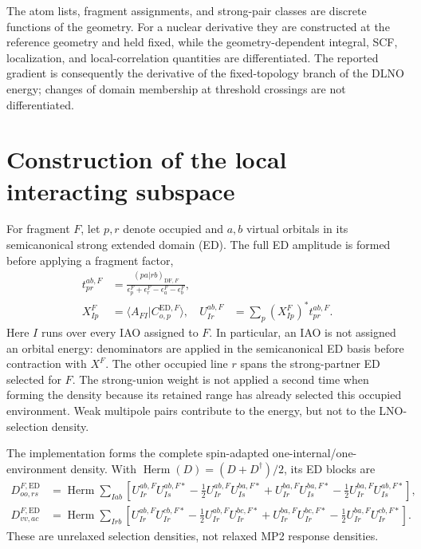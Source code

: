 \documentclass[11pt]{article}
\begin{document}
The atom lists, fragment assignments, and strong-pair classes are discrete
functions of the geometry.  For a nuclear derivative they are constructed at
the reference geometry and held fixed, while the geometry-dependent integral,
SCF, localization, and local-correlation quantities are differentiated.  The
reported gradient is consequently the derivative of the fixed-topology branch
of the DLNO energy; changes of domain membership at threshold crossings are not
differentiated.

\section{Construction of the local interacting subspace}
\label{sec:lis-construction}

For fragment $F$, let $p,r$ denote occupied and $a,b$ virtual orbitals in its
semicanonical strong extended domain (ED).  The full ED amplitude is formed
before applying a fragment factor,
\begin{align}
 t_{pr}^{ab,F}
 &=\frac{(pa|rb)_{\mathrm{DF},F}}
 {\epsilon_p^F+\epsilon_r^F-\epsilon_a^F-\epsilon_b^F},
 \\
 X_{Ip}^F
 &=\langle A_{FI}|C_{o,p}^{\mathrm{ED},F}\rangle,
 &
 U_{Ir}^{ab,F}
 &=\sum_p (X_{Ip}^F)^*t_{pr}^{ab,F}.
 \label{eq:iao-target-conditioned-amplitude}
\end{align}
Here $I$ runs over every IAO assigned to $F$.  In particular, an IAO is not
assigned an orbital energy: denominators are applied in the semicanonical ED
basis before contraction with $X^F$.  The other occupied line $r$ spans the
strong-partner ED selected for $F$.  The strong-union weight is not applied a
second time when forming the density because its retained range has already
selected this occupied environment.  Weak multipole pairs contribute to the
energy, but not to the LNO-selection density.

The implementation forms the complete spin-adapted one-internal/one-environment
density.  With $\operatorname{Herm}(D)=(D+D^\dagger)/2$, its ED blocks are
\begin{align}
 D_{oo,rs}^{F,\mathrm{ED}}
 &=\operatorname{Herm}\!\sum_{Iab}\!\left[
 U_{Ir}^{ab,F}U_{Is}^{ab,F*}
 -\tfrac12 U_{Ir}^{ab,F}U_{Is}^{ba,F*}
 +U_{Ir}^{ba,F}U_{Is}^{ba,F*}
 -\tfrac12 U_{Ir}^{ba,F}U_{Is}^{ab,F*}
 \right],
 \label{eq:iao-lis-density-oo}\\
 D_{vv,ac}^{F,\mathrm{ED}}
 &=\operatorname{Herm}\!\sum_{Irb}\!\left[
 U_{Ir}^{ab,F}U_{Ir}^{cb,F*}
 -\tfrac12 U_{Ir}^{ab,F}U_{Ir}^{bc,F*}
 +U_{Ir}^{ba,F}U_{Ir}^{bc,F*}
 -\tfrac12 U_{Ir}^{ba,F}U_{Ir}^{cb,F*}
 \right].
 \label{eq:iao-lis-density-vv}
\end{align}
These are unrelaxed selection densities, not relaxed MP2 response densities.
\end{document}
